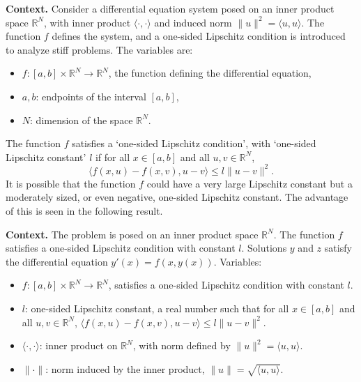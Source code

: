 \noindent\textbf{Context.}
Consider a differential equation system posed on an inner product space $\mathbb{R}^N$, with inner product $\langle \cdot, \cdot \rangle$ and induced norm $\|u\|^2 = \langle u, u \rangle$. The function $f$ defines the system, and a one-sided Lipschitz condition is introduced to analyze stiff problems. The variables are:
\begin{itemize}
    \item $f : [a, b] \times \mathbb{R}^N \to \mathbb{R}^N$, the function defining the differential equation,
    \item $a, b$: endpoints of the interval $[a, b]$,
    \item $N$: dimension of the space $\mathbb{R}^N$.
\end{itemize}

\begin{definition}

  \label{def:112A}
The function $f$ satisfies a `one-sided Lipschitz condition',
with `one-sided Lipschitz constant' $l$ if for all $x \in [a, b]$ and all $u, v \in \mathbb{R}^N$,
\[
\langle f(x, u) - f(x, v), u - v \rangle \leq l \| u - v \|^2.
\]
It is possible that the function $f$ could have a very large Lipschitz constant
but a moderately sized, or even negative, one-sided Lipschitz constant. The
advantage of this is seen in the following result.
\end{definition}

\noindent\textbf{Context.}
The problem is posed on an inner product space $\mathbb{R}^N$.
The function $f$ satisfies a one-sided Lipschitz condition with constant $l$.
Solutions $y$ and $z$ satisfy the differential equation $y'(x) = f(x, y(x))$.
Variables:
\begin{itemize}
    \item $f: [a, b] \times \mathbb{R}^N \to \mathbb{R}^N$, satisfies a one-sided Lipschitz condition with constant $l$.
    \item $l$: one-sided Lipschitz constant, a real number such that for all $x \in [a, b]$ and all $u, v \in \mathbb{R}^N$, $\langle f(x, u) - f(x, v), u - v \rangle \leq l \|u - v\|^2$.
    \item $\langle \cdot, \cdot \rangle$: inner product on $\mathbb{R}^N$, with norm defined by $\|u\|^2 = \langle u, u \rangle$.
    \item $\|\cdot\|$: norm induced by the inner product, $\|u\| = \sqrt{\langle u, u \rangle}$.
\end{itemize}

